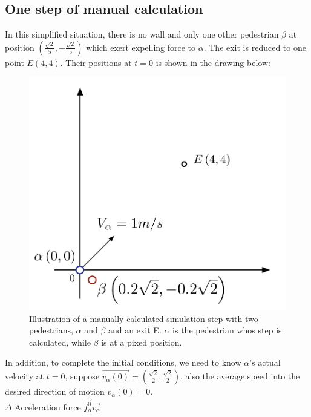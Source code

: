 \subsection{One step of manual calculation}

In this simplified situation, there is no wall and only one other pedestrian $\beta$ at position $(\frac{\sqrt{2}}{5}, -\frac{\sqrt{2}}{5})$ which exert expelling force to $\alpha$.  The exit is reduced to one point $E(4,4)$.  Their positions at $t=0$ is shown in the drawing below:\\

\begin{figure}
\centering
\includegraphics[scale=0.45]{Figures/calculation.pdf}
\caption[Manual calculation]{Illustration of a manually calculated simulation step with two pedestrians, $\alpha$ and $\beta$ and an exit E.
$\alpha$ is the pedestrian whos step is calculated, while $\beta$ is at a pixed position.}
\label{calc}
\end{figure}

In addition, to complete the initial conditions, we need to know $\alpha$'s actual velocity at $t=0$, suppose $\overrightarrow{v_{\alpha}(0)}=(\frac{\sqrt{2}}{2}, \frac{\sqrt{2}}{2})$, also the average speed into the desired direction of motion $\overline{v_{\alpha}(0)}=0$.\\

$\Delta$ Acceleration force  
$\overrightarrow{f^{0}_{\alpha}}\overrightarrow{v_{\alpha}} $\\

